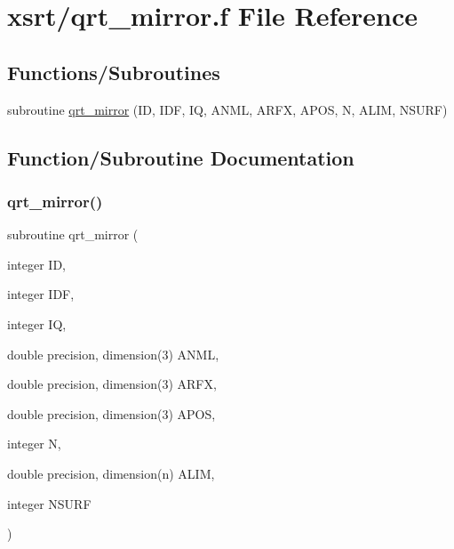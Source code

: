 \hypertarget{qrt__mirror_8f}{}\section{xsrt/qrt\+\_\+mirror.f File Reference}
\label{qrt__mirror_8f}
\subsection*{Functions/\+Subroutines}
\begin{DoxyCompactItemize}
\item 
subroutine \hyperlink{qrt__mirror_8f_a8c4c7f57fe1b353372b676e08b7a0749}{qrt\+\_\+mirror} (ID, I\+DF, IQ, A\+N\+ML, A\+R\+FX, A\+P\+OS, N, A\+L\+IM, N\+S\+U\+RF)
\end{DoxyCompactItemize}


\subsection{Function/\+Subroutine Documentation}
\mbox{\label{qrt__mirror_8f_a8c4c7f57fe1b353372b676e08b7a0749}} 
\subsubsection{\texorpdfstring{qrt\+\_\+mirror()}{qrt\_mirror()}}
{\footnotesize\ttfamily subroutine qrt\+\_\+mirror (\begin{DoxyParamCaption}\item[{integer}]{ID,  }\item[{integer}]{I\+DF,  }\item[{integer}]{IQ,  }\item[{double precision, dimension(3)}]{A\+N\+ML,  }\item[{double precision, dimension(3)}]{A\+R\+FX,  }\item[{double precision, dimension(3)}]{A\+P\+OS,  }\item[{integer}]{N,  }\item[{double precision, dimension(n)}]{A\+L\+IM,  }\item[{integer}]{N\+S\+U\+RF }\end{DoxyParamCaption})}

